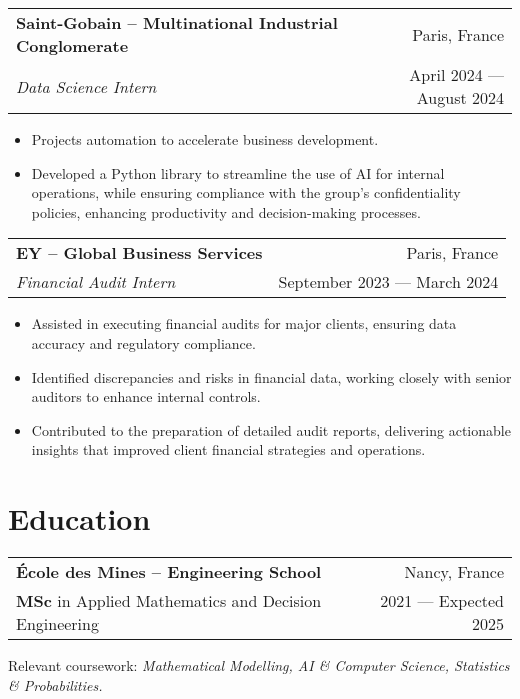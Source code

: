 \documentclass[a4paper,9pt]{extarticle}
\begin{document}
\begin{tabularx}{\textwidth}{@{}Xr@{}}
\textbf{Saint-Gobain -- Multinational Industrial Conglomerate} & Paris, France\\
\textit{Data Science Intern} & April 2024 — August 2024\\
\end{tabularx}
\vspace{-5pt}
\begin{itemize} \itemsep -1pt
    \item Projects automation to accelerate business development.
    \item Developed a Python library to streamline the use of AI for internal operations, while ensuring compliance with the group’s confidentiality policies, enhancing productivity and decision-making processes.
\end{itemize}

\vspace{7pt} %
\noindent
\begin{tabularx}{\textwidth}{@{}Xr@{}}
\textbf{EY -- Global Business Services} & Paris, France\\
\textit{Financial Audit Intern} & September 2023 — March 2024\\
\end{tabularx}
\vspace{-5pt}
\begin{itemize} \itemsep -1pt
    \item Assisted in executing financial audits for major clients, ensuring data accuracy and regulatory compliance.
    \item Identified discrepancies and risks in financial data, working closely with senior auditors to enhance internal controls.
    \item Contributed to the preparation of detailed audit reports, delivering actionable insights that improved client financial strategies and operations.
\end{itemize}

\section*{\faGraduationCap \hspace{0.1em} Education}

\begin{tabularx}{\textwidth}{@{}Xr@{}}
\textbf{École des Mines -- Engineering School} & Nancy, France\\
\textbf{MSc} in Applied Mathematics and Decision Engineering & 2021 — Expected 2025\\
\end{tabularx}
\vspace{-5pt}
Relevant coursework: \textit{Mathematical Modelling, AI \& Computer Science, Statistics \& Probabilities.}
\end{document}
